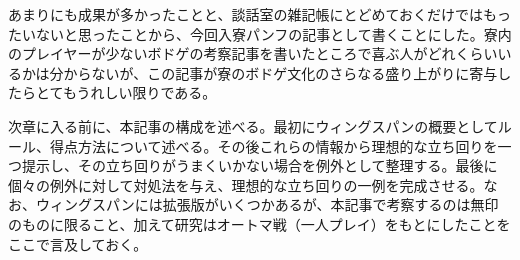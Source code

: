 \begin{multicols}{2}
\par
あまりにも成果が多かったことと、談話室の雑記帳にとどめておくだけではもったいないと思ったことから、今回入寮パンフの記事として書くことにした。寮内のプレイヤーが少ないボドゲの考察記事を書いたところで喜ぶ人がどれくらいいるかは分からないが、この記事が寮のボドゲ文化のさらなる盛り上がりに寄与したらとてもうれしい限りである。
\par
次章に入る前に、本記事の構成を述べる。最初にウィングスパンの概要としてルール、得点方法について述べる。その後これらの情報から理想的な立ち回りを一つ提示し、その立ち回りがうまくいかない場合を例外として整理する。最後に個々の例外に対して対処法を与え、理想的な立ち回りの一例を完成させる。なお、ウィングスパンには拡張版がいくつかあるが、本記事で考察するのは無印のものに限ること、加えて研究はオートマ戦（一人プレイ）をもとにしたことをここで言及しておく。
\end{multicols}
